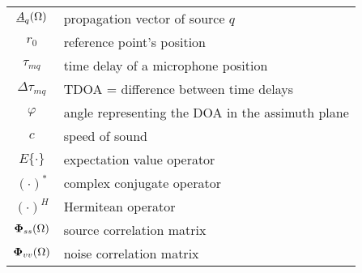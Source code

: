 \begin{tabular}{cp{}}
  $\underline{A}_q(\Omega)$ & propagation vector of source $q$\\
  $r_0$ & reference point's position\\
  $\tau_{mq}$     & time delay of a microphone position \\
  $\Delta\tau_{mq}$ & TDOA = difference between time delays\\

  $\varphi$       & angle representing the \ac{DOA} in the assimuth plane\\
  $c$             & speed of sound \\
  $E\{\cdot\}$    & expectation value operator \\
  $(\cdot)^*$            & complex conjugate operator \\
  $(\cdot)^H$    & Hermitean operator\\
  $\mathbf{\Phi}_{ss}(\Omega)$  & source correlation matrix \\
  $\mathbf{\Phi}_{vv}(\Omega)$  & noise correlation matrix \\
\end{tabular}


